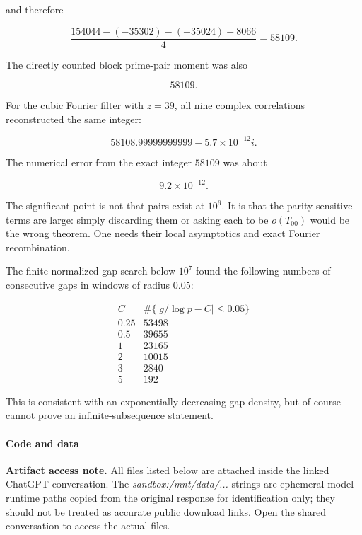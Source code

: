 and therefore

\[
\frac{154044-(-35302)-(-35024)+8066}{4}
=
58109.
\]

The directly counted block prime-pair moment was also

\[
58109.
\]

For the cubic Fourier filter with \(z=39\), all nine complex correlations reconstructed the same integer:

\[
58108.99999999999-5.7\times10^{-12}i.
\]

The numerical error from the exact integer \(58109\) was about

\[
9.2\times10^{-12}.
\]

The significant point is not that pairs exist at \(10^6\). It is that the parity-sensitive terms are large: simply discarding them or asking each to be \(o(T_{00})\) would be the wrong theorem. One needs their local asymptotics and exact Fourier recombination.

The finite normalized-gap search below \(10^7\) found the following numbers of consecutive gaps in windows of radius \(0.05\):

\[
\begin{array}{c|r}
C&\#\{|g/\log p-C|\le0.05\}\\ \hline
0.25&53498\\
0.5&39655\\
1&23165\\
2&10015\\
3&2840\\
5&192
\end{array}
\]

This is consistent with an exponentially decreasing gap density, but of course cannot prove an infinite-subsequence statement.

\paragraph{Code and data}

\noindent\textbf{Artifact access note.}
All files listed below are attached inside the linked ChatGPT conversation. The \emph{sandbox:/mnt/data/...} strings are ephemeral model-runtime paths copied from the original response for identification only; they should not be treated as accurate public download links. Open the shared conversation to access the actual files.

